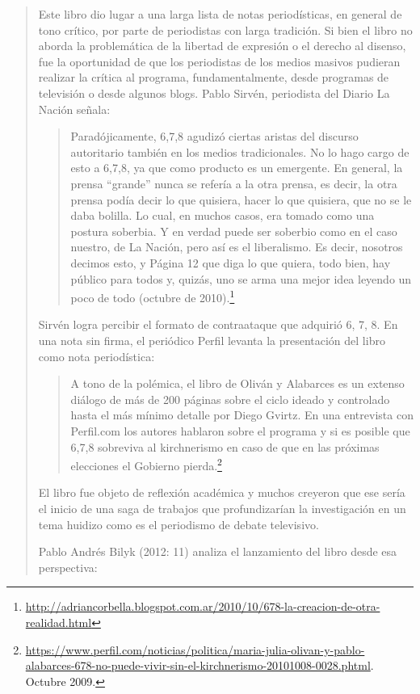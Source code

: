 {\begin{quote}
Este libro dio lugar a una larga lista de notas periodísticas, en general de tono crítico, por parte de periodistas con larga tradición. Si bien el libro no aborda la problemática de la libertad de expresión o el derecho al disenso, fue la oportunidad de que los periodistas de los medios masivos pudieran realizar la crítica al programa, fundamentalmente, desde programas de televisión o desde algunos blogs. Pablo Sirvén, periodista del Diario La Nación señala:

\begin{quote}
Paradójicamente, 6,7,8 agudizó ciertas aristas del discurso autoritario también en los medios tradicionales. No lo hago cargo de esto a 6,7,8, ya que como producto es un emergente. En general, la prensa \enquote{grande} nunca se refería a la otra prensa, es decir, la otra prensa podía decir lo que quisiera, hacer lo que quisiera, que no se le daba bolilla. Lo cual, en muchos casos, era tomado como una postura soberbia. Y en verdad puede ser soberbio como en el caso nuestro, de La Nación, pero así es el liberalismo. Es decir, nosotros decimos esto, y Página 12 que diga lo que quiera, todo bien, hay público para todos y, quizás, uno se arma una mejor idea leyendo un poco de todo (octubre de 2010).\footnote{\url{http://adriancorbella.blogspot.com.ar/2010/10/678-la-creacion-de-otra-realidad.html}}
\end{quote}

Sirvén logra percibir el formato de contraataque que adquirió 6, 7, 8. En una nota sin firma, el periódico Perfil levanta la presentación del libro como nota periodística:

\begin{quote}
A tono de la polémica, el libro de Oliván y Alabarces es un extenso diálogo de más de 200 páginas sobre el ciclo ideado y controlado hasta el más mínimo detalle por Diego Gvirtz. En una entrevista con Perfil.com los autores hablaron sobre el programa y si es posible que 6,7,8 sobreviva al kirchnerismo en caso de que en las próximas elecciones el Gobierno pierda.\footnote{\url{https://www.perfil.com/noticias/politica/maria-julia-olivan-y-pablo-alabarces-678-no-puede-vivir-sin-el-kirchnerismo-20101008-0028.phtml}. Octubre 2009.}
\end{quote}

El libro fue objeto de reflexión académica y muchos creyeron que ese sería el inicio de una saga de trabajos que profundizarían la investigación en un tema huidizo como es el periodismo de debate televisivo.

Pablo Andrés Bilyk (2012: 11) analiza el lanzamiento del libro desde esa perspectiva:


\end{quote}}
